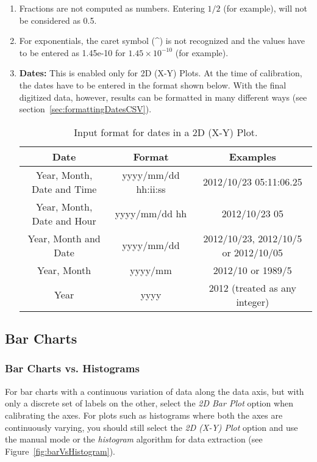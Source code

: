 \documentclass[letterpaper, 11pt]{article}
\begin{document}
\begin{enumerate}
\item{Fractions are not computed as numbers. Entering $1/2$ (for example), will not be considered as 0.5.}
\item{For exponentials, the caret symbol (\^{}) is not recognized and the values have to be entered as 1.45e-10 for $1.45 \times 10^{-10}$ (for example).}
\item{{\bf Dates:} This is enabled only for 2D (X-Y) Plots. At the time of calibration, the dates have to be entered in the format shown below. With the final digitized data, however, results can be formatted in many different ways (see section~\ref{sec:formattingDatesCSV}).
\begin{center}
\begin{table}[h]	
\caption{Input format for dates in a 2D (X-Y) Plot.}
\begin{tabular}{|c|c|c|}
\hline
Date & Format & Examples\\
\hline
Year, Month, Date and Time & yyyy/mm/dd hh:ii:ss & 2012/10/23 05:11:06.25\\
Year, Month, Date and Hour & yyyy/mm/dd hh & 2012/10/23 05\\ 
Year, Month and Date & yyyy/mm/dd & 2012/10/23, 2012/10/5 or 2012/10/05\\
Year, Month & yyyy/mm & 2012/10 or 1989/5\\
Year & yyyy & 2012 (treated as any integer)\\
\hline
\end{tabular}
\end{table}
\end{center}
}
\end{enumerate}


\subsection{Bar Charts}

\subsubsection{Bar Charts vs. Histograms}
For bar charts with a continuous variation of data along the data axis, but with only a discrete set of labels on the other, select the \emph{2D Bar Plot} option when calibrating the axes. For plots such as histograms where both the axes are continuously varying, you should still select the \emph{2D (X-Y) Plot} option and use the manual mode or the \emph{histogram} algorithm for data extraction (see Figure~\ref{fig:barVsHistogram}).
\end{document}
